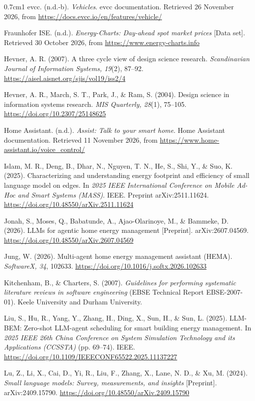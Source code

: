 \documentclass[12pt,a4paper]{report}
\begin{document}
\begin{hangparas}{0.7cm}{1}
evcc. (n.d.-b). \textit{Vehicles}. evcc documentation. Retrieved 26
November 2026, from \url{https://docs.evcc.io/en/features/vehicle/}

Fraunhofer ISE. (n.d.). \textit{Energy-Charts: Day-ahead spot market
prices} [Data set]. Retrieved 30 October 2026, from
\url{https://www.energy-charts.info}

Hevner, A. R. (2007). A three cycle view of design science research.
\textit{Scandinavian Journal of Information Systems, 19}(2), 87--92.
\url{https://aisel.aisnet.org/sjis/vol19/iss2/4}

Hevner, A. R., March, S. T., Park, J., \& Ram, S. (2004). Design
science in information systems research. \textit{MIS Quarterly, 28}(1),
75--105. \url{https://doi.org/10.2307/25148625}

Home Assistant. (n.d.). \textit{Assist: Talk to your smart home}.
Home Assistant documentation. Retrieved 11 November 2026, from
\url{https://www.home-assistant.io/voice_control/}

Islam, M. R., Deng, B., Dhar, N., Nguyen, T. N., He, S., Shi, Y., \&
Suo, K. (2025). Characterizing and understanding energy footprint and
efficiency of small language model on edges. In \textit{2025 IEEE
International Conference on Mobile Ad-Hoc and Smart Systems (MASS)}.
IEEE. Preprint arXiv:2511.11624.
\url{https://doi.org/10.48550/arXiv.2511.11624}

Jonah, S., Moses, Q., Babatunde, A., Ajao-Olarinoye, M., \& Bammeke, D.
(2026). LLMs for agentic home energy management [Preprint].
arXiv:2607.04569. \url{https://doi.org/10.48550/arXiv.2607.04569}

Jung, W. (2026). Multi-agent home energy management assistant (HEMA).
\textit{SoftwareX, 34}, 102633.
\url{https://doi.org/10.1016/j.softx.2026.102633}

Kitchenham, B., \& Charters, S. (2007). \textit{Guidelines for
performing systematic literature reviews in software engineering}
(EBSE Technical Report EBSE-2007-01). Keele University and Durham
University.

Liu, S., Hu, R., Yang, Y., Zhang, H., Ding, X., Sun, H., \& Sun, L.
(2025). LLM-BEM: Zero-shot LLM-agent scheduling for smart building
energy management. In \textit{2025 IEEE 26th China Conference on System
Simulation Technology and its Applications (CCSSTA)} (pp. 69--74). IEEE.
\url{https://doi.org/10.1109/IEEECONF65522.2025.11137227}

Lu, Z., Li, X., Cai, D., Yi, R., Liu, F., Zhang, X., Lane, N. D., \&
Xu, M. (2024). \textit{Small language models: Survey, measurements, and
insights} [Preprint]. arXiv:2409.15790.
\url{https://doi.org/10.48550/arXiv.2409.15790}


\end{hangparas}
\end{document}
